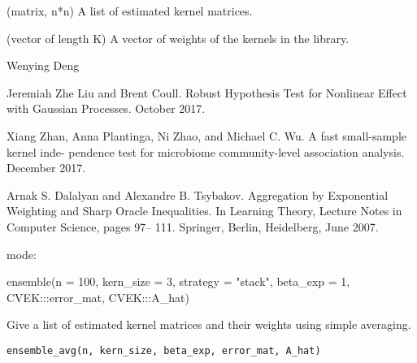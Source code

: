 \documentclass[a4paper]{book}
\begin{document}
%
\begin{Value}
\begin{ldescription}
\item[\code{A\_est}] (matrix, n*n) A list of estimated kernel matrices.

\item[\code{u\_hat}] (vector of length K) A vector of weights of the kernels in the
library.
\end{ldescription}
\end{Value}
%
\begin{Author}\relax
Wenying Deng
\end{Author}
%
\begin{References}\relax
Jeremiah Zhe Liu and Brent Coull. Robust Hypothesis Test for
Nonlinear Effect with Gaussian Processes. October 2017.

Xiang Zhan, Anna Plantinga, Ni Zhao, and Michael C. Wu. A fast small-sample
kernel inde- pendence test for microbiome community-level association
analysis. December 2017.

Arnak S. Dalalyan and Alexandre B. Tsybakov. Aggregation by Exponential
Weighting and Sharp Oracle Inequalities. In Learning Theory, Lecture Notes
in Computer Science, pages 97– 111. Springer, Berlin, Heidelberg, June 2007.
\end{References}
%
\begin{SeeAlso}\relax
mode: 
\end{SeeAlso}
%
\begin{Examples}
\begin{ExampleCode}



ensemble(n = 100, kern_size = 3, strategy = "stack", beta_exp = 1, 
CVEK:::error_mat, CVEK:::A_hat)



\end{ExampleCode}
\end{Examples}
%
\begin{Description}\relax
Give a list of estimated kernel matrices and their weights using simple
averaging.
\end{Description}
%
\begin{Usage}
\begin{verbatim}
ensemble_avg(n, kern_size, beta_exp, error_mat, A_hat)
\end{verbatim}
\end{Usage}
\end{document}
